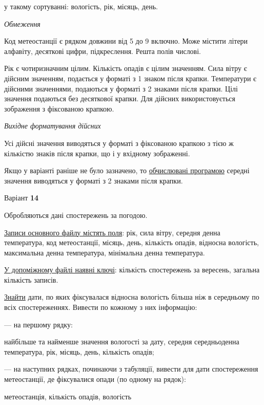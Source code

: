 \documentclass[11pt, ukrainian]{article}
\begin{document}
{\noindent}у такому сортуванні: вологість, рік, місяць, день.


\bigskip\textit{Обмеження}

Код метеостанції є рядком довжини від 5 до 9 включно.
Може містити літери алфавіту, десяткові цифри, підкреслення. Решта полів числові.

Рік є чотиризначним цілим.
Кількість опадів є цілим значенням.
Сила вітру є дійсним значенням, подається у форматі з 1 знаком після крапки.
Температури є дійсними значеннями, подаються у форматі з 2 знаками після крапки.
Цілі значення подаються без десяткової крапки.
Для дійсних використовується зображення з фіксованою крапкою.

\textit{Вихідне форматування дійсних}

Усі дійсні значення виводяться у форматі з фіксованою крапкою з тією ж кількістю знаків після крапки, що і у вхідному зображенні.

Якщо у варіанті раніше не було зазначено, то \underline{обчислювані програмою} середні значення виводяться у форматі з 2 знаками після крапки.


\par
\newpage
{\center Варіант  \No \textbf { 14 }\par}
\bigskip
Обробляються дані спостережень за погодою. 

\underline{Записи основного файлу містять поля}: рік, сила вітру, середня денна температура, код метеостанції, місяць, день, кількість опадів, відносна вологість, максимальна денна температура, мінімальна денна температура.

\underline{У допоміжному файлі наявні ключі}: кількість спостережень за вересень, загальна кількість записів.

\underline{Знайти} дати, по яких фіксувалася відносна вологість більша ніж в середньому по всіх спостереженнях. Вивести по кожному з них інформацію:\par
{\noindent}--- на першому рядку:\par
найбільше та найменше значення вологості за дату, середня середньоденна температура, рік, місяць, день, кількість опадів;

{\noindent}--- на наступних рядках, починаючи з табуляції, вивести для дати спостереження метеостанції, де фіксувалися опади (по одному на рядок):\par
метеостанція, кількість опадів, вологість
\end{document}
